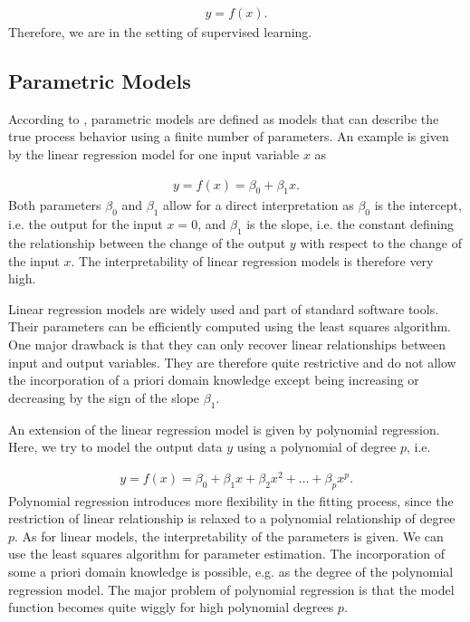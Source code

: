 \begin{align} \label{eq:basic-model-structure}
	y = f(x).
\end{align}
%
Therefore, we are in the setting of supervised learning. 

\subsection{Parametric Models}

According to \cite{nelles2013nonlinear}, parametric models are defined as models that can describe the true process behavior using a finite number of parameters. An example is given by the linear regression model for one input variable $x$ as

\begin{align} \label{eq:classical-linear-model}
	y= f(x) = \beta_0 + \beta_1 x.
\end{align}
%
Both parameters $\beta_0$ and $\beta_1$ allow for a direct interpretation as $\beta_0$ is the intercept, i.e. the output for the input $x=0$, and $\beta_1$ is the slope, i.e. the constant defining the relationship between the change of the output $y$ with respect to the change of the input $x$.  The interpretability of linear regression models is therefore very high. 

Linear regression models are widely used and part of standard software tools. Their parameters can be efficiently computed using the least squares algorithm. One major drawback is that they can only recover linear relationships between input and output variables. They are therefore quite restrictive and do not allow the incorporation of a priori domain knowledge except being increasing or decreasing by the sign of the slope $\beta_1$. 

An extension of the linear regression model is given by polynomial regression. Here, we try to model the output data $y$ using a polynomial of degree $p$, i.e.

\begin{align} \label{eq:polynomial-model}
	y = f(x) = \beta_0 + \beta_1 x + \beta_2 x^2 + \dots + \beta_p x^p.
\end{align}
%
Polynomial regression introduces more flexibility in the fitting process, since the restriction of linear relationship is relaxed to a polynomial relationship of degree $p$. As for linear models, the interpretability of the parameters is given. We can use the least squares algorithm for parameter estimation. The incorporation of some a priori domain knowledge is possible, e.g. as the degree of the polynomial regression model. The major problem of polynomial regression is that the model function becomes quite wiggly for high polynomial degrees $p$. 

